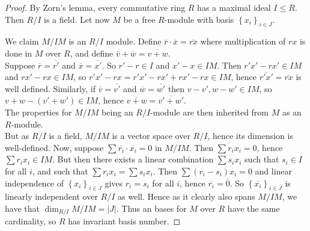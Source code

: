 \documentclass[reqno]{amsart}
\theoremstyle{definition}
\theoremstyle{remark}
\begin{document}
        \begin{proof}
            By Zorn's lemma, every commutative ring
            $R$ has a maximal ideal $I \le R$. Then
            $R /I$ is a field. Let
            now $M$ be a free  $R$-module with basis
            $\left\{ x_i \right\}_{i \in J}$. 

            We claim $M / IM$ is an $R /I$ module.
            Define
            $\overline{r} \cdot  \overline{x} = \overline{rx}$ where
            multiplication of $rx$ is done in $M$ over
            $R$, and define $\overline{v} + \overline{w}
            = \overline{v+w}$.\\
            Suppose $\overline{r} = \overline{r'}$ and
            $\overline{x} = \overline{x'}$.
            So $r' -r \in I$ and
            $x' -x \in IM$.
            Then $r'x' - r x' \in IM$ and
             $rx' - rx \in IM$, so
             $r'x' - rx = r'x' - rx' + rx' - rx \in IM$,
             hence $\overline{r'x'} = \overline{rx}$ is well
             defined.
             Similarly,  if 
             $\overline{v} = \overline{v'}$ and
             $\overline{w} = \overline{w'}$ then
             $v-v', w-w' \in IM$, so
             $v+w - \left( v'+w' \right) 
             \in IM$, hence
             $\overline{v+w} = \overline{v'+w'}$.\\

             The properties for
             $M /IM$ being an $R /I$-module are then inherited
             from $M$ as an $R$-module.\\
             \linebreak
             But as $R /I$ is a field, $M /IM$ is a vector space
             over $R /I$, hence its dimension is well-defined.
             Now, suppose
             $\sum \overline{r_i} \cdot  \overline{x_i} = 0$ in
             $M /IM$. Then
             $\overline{\sum r_i x_i} = 0$, hence
             $\sum r_i x_i \in IM$. But  then
             there exists a linear combination
             $\sum s_i x_i$ such that $s_i \in I$ for all $i$,
             and such that $\sum r_ix_i = \sum s_i x_i$.
             Then $\sum (r_i - s_i) x_i = 0$ and linear
             independence of $\left\{ x_i \right\}_{i \in J}$ 
             gives $r_i = s_i$ for all $i$, hence
             $\overline{r_i} = \overline{0}$.
             So $\left\{ \overline{x_i} \right\}_{i \in J}$ 
             is linearly independent over $R /I$ as well.
             Hence as it clearly also spans
             $M /IM$, we have that
             $\dim_{R /I} M/IM = \left| J \right| $. 
             Thus an bases for
             $M $ over $R$ have the same cardinality, so
             $R$ has invariant basis number.
        \end{proof}
\end{document}
